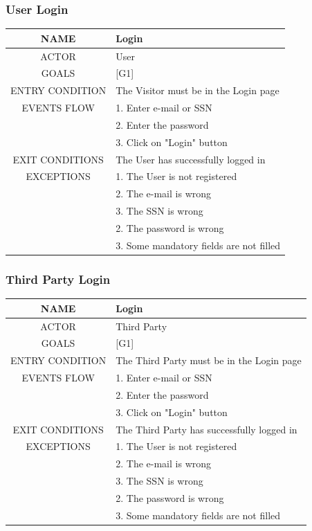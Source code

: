 \documentclass[12pt,a4paper]{article}
\begin{document}
	\subsubsection{User Login }
	\begin{center}
		\begin{tabular}{| c | l |}
			\hline
			NAME & Login \\
			\hline
			ACTOR & User \\
			\hline
			GOALS & [G1] \\
			\hline
			ENTRY CONDITION & The Visitor must be in the Login page \\ \hline
			EVENTS FLOW  &
			1. Enter e-mail or SSN\\
			&2. Enter the password\\
			&3. Click on "Login" button\\
			\hline
			EXIT CONDITIONS  & The User has successfully logged in \\ \hline
			EXCEPTIONS & 
			1. The User is not registered\\
			&2. The e-mail is wrong\\
			&3. The SSN is wrong\\
			&2. The password is wrong\\
			&3. Some mandatory fields are not filled\\
			\hline
		\end{tabular}
	\end{center}

	\subsubsection{Third Party Login}
	\begin{center}
		\begin{tabular}{| c | l |}
			\hline
			NAME & Login \\
			\hline
			ACTOR & Third Party \\
			\hline
			GOALS & [G1] \\
			\hline
			ENTRY CONDITION & The Third Party must be in the Login page \\ \hline
			EVENTS FLOW  &
			1. Enter e-mail or SSN\\
			&2. Enter the password\\
			&3. Click on "Login" button\\
			\hline
			EXIT CONDITIONS  & The Third Party has successfully logged in \\ \hline
			EXCEPTIONS & 
			1. The User is not registered\\
			&2. The e-mail is wrong\\
			&3. The SSN is wrong\\
			&2. The password is wrong\\
			&3. Some mandatory fields are not filled\\
			\hline
		\end{tabular}
	\end{center}
\end{document}
